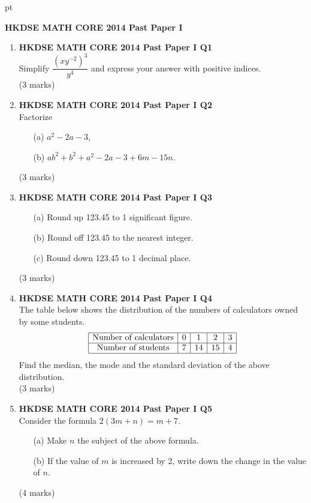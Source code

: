 \documentclass[12pt]{article}
\begin{document}
 pt
\begin{center}
	{\large \bf HKDSE MATH CORE 2014 Past Paper I}\\
	\vspace{2 mm}

\end{center}
\vspace{0.05cm}

\begin{enumerate}
	\item \textbf{HKDSE MATH CORE 2014 Past Paper I Q1}\\
	Simplify $\dfrac{(xy^{-2})^3}{y^4}$ and express your answer with positive indices. \\(3 marks)	
	
	\item \textbf{HKDSE MATH CORE 2014 Past Paper I Q2}\\
	Factorize
	\begin{enumerate}
		\item [(a)] $a^2 - 2a - 3$,
		\item [(b)] $ab^2 + b^2 + a^2 - 2a - 3 + 6m - 15n$.
	\end{enumerate}
	(3 marks)

	\item \textbf{HKDSE MATH CORE 2014 Past Paper I Q3}
	\begin{enumerate}
		\item[(a)] Round up 123.45 to 1 significant figure.
		\item[(b)] Round off 123.45 to the nearest integer.
		\item[(c)] Round down 123.45 to 1 decimal place.	
	\end{enumerate}
	(3 marks)

	\item \textbf{HKDSE MATH CORE 2014 Past Paper I Q4}\\
	The table below shows the distribution of the numbers of calculators owned by some students.
	$$\begin{array}{|c|c|c|c|c|}
		\hline
		\text{Number of calculators} & 0 & 1 & 2 & 3 \\
		\hline
		\text{Number of students} & 7 & 14 & 15 & 4 \\
		\hline
	\end{array}$$
	Find the median, the mode and the standard deviation of the above distribution. \\(3 marks)

	\item \textbf{HKDSE MATH CORE 2014 Past Paper I Q5}\\
	Consider the formula $2(3m +n) = m + 7$.
	\begin{enumerate}
		\item[(a)] Make $n$ the subject of the above formula.
		\item[(b)] If the value of $m$ is increased by 2, write down the change in the value of $n$.	
	\end{enumerate}
	(4 marks)


\end{enumerate}
\end{document}
